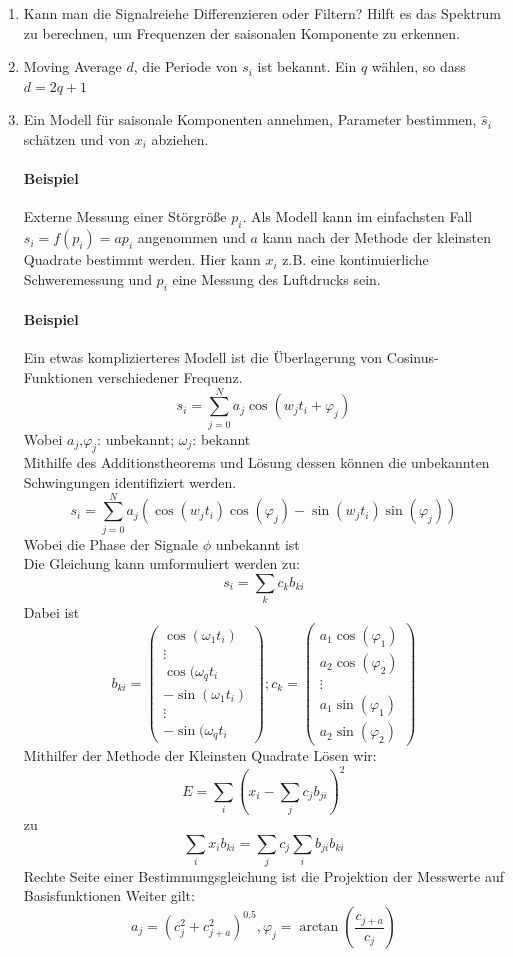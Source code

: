 \begin{enumerate}
\item Kann man die Signalreiehe Differenzieren oder Filtern? Hilft es das Spektrum zu berechnen, um Frequenzen der saisonalen Komponente zu erkennen.

\item Moving Average $d$, die Periode von $s_i$ ist bekannt. Ein $q$ wählen, so dass $d=2q+1$\\

\item Ein Modell für saisonale Komponenten annehmen, Parameter bestimmen, $\hat s_i$ schätzen und von $x_i$ abziehen.

\paragraph{Beispiel} Externe Messung einer Störgröße $p_i$. Als Modell kann im einfachsten Fall $s_i=f(p_i) = ap_i$ angenommen und $a$ kann nach der Methode der kleinsten Quadrate bestimmt werden. Hier kann $x_i$ z.B. eine kontinuierliche Schweremessung und $p_i$ eine Messung des Luftdrucks sein. 

\paragraph{Beispiel} Ein etwas komplizierteres Modell ist die Überlagerung von Cosinus-Funktionen verschiedener Frequenz.
\[
s_i=\sum\limits_{j=0}^N a_j \cos(w_jt_i+\varphi_j)
\]
Wobei $a_j$,$\varphi_j$: unbekannt; $\omega_j$: bekannt\\
Mithilfe des Additionstheorems und Lösung dessen können die unbekannten Schwingungen identifiziert werden.
\[
s_i=\sum\limits_{j=0}^N a_j (\cos(w_jt_i)\cos(\varphi_j) - \sin(w_jt_i) \sin(\varphi_j))
\]
Wobei die Phase der Signale $\phi$ unbekannt ist\\
Die Gleichung kann umformuliert werden zu:
\[
s_i=\sum\limits_k c_k b_{ki}
\]
Dabei ist
\[
b_{ki}=
\begin{pmatrix}
\cos(\omega_1t_i)\\
\vdots \\
\cos(\omega_qt_i \\
-\sin(\omega_1t_i)\\
\vdots \\
-\sin(\omega_qt_i
\end{pmatrix}
; c_k=
\begin{pmatrix} 
a_1 \cos(\varphi_1)\\
a_2 \cos(\varphi_2)\\
\vdots\\
a_1 \sin(\varphi_1) \\
a_2 \sin(\varphi_2)
\end{pmatrix}
\]
Mithilfer der Methode der Kleinsten Quadrate Lösen wir:
\[
E = \sum\limits_i (x_i- \sum\limits_j c_j b_{ji})^2
\]
zu
\[
\sum\limits_i x_i b_{ki} = \sum\limits_j c_j\sum\limits_i b_{ji}b_{ki}
\]
Rechte Seite einer Bestimmungsgleichung ist die Projektion der Messwerte auf Basisfunktionen
Weiter gilt:
\[
a_j=(c_j^2+c_{j+a}^2)^{0.5}, \varphi_j=\arctan(\frac{c_{j+a}}{c_j})
\]


\end{enumerate}
